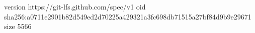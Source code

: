 version https://git-lfs.github.com/spec/v1
oid sha256:a0711e2901b82d549ed2d70225a429321a3fc698db71515a27bf84d9b9e29671
size 5566
